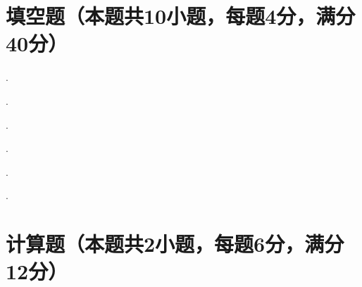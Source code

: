 \documentclass{CWNUExam}
\begin{document}
\begin{problem}

\paren[]
\begin{choices}
	\item
	\item
	\item
	\item
\end{choices}
\end{problem}

\section{填空题（本题共10小题，每题4分，满分40分）}

\begin{problem}

\fillin{}.
\end{problem}

\begin{problem}

\fillin{}.
\end{problem}

\begin{problem}

\fillin{}.
\end{problem}

\begin{problem}

\fillin{}.
\end{problem}

\begin{problem}

\fillin{}.
\end{problem}

\begin{problem}

\fillin{}.
\end{problem}

\section{计算题（本题共2小题，每题6分，满分12分）}

\begin{problem}

\end{problem}

\begin{solution}

\end{solution}
\end{document}
